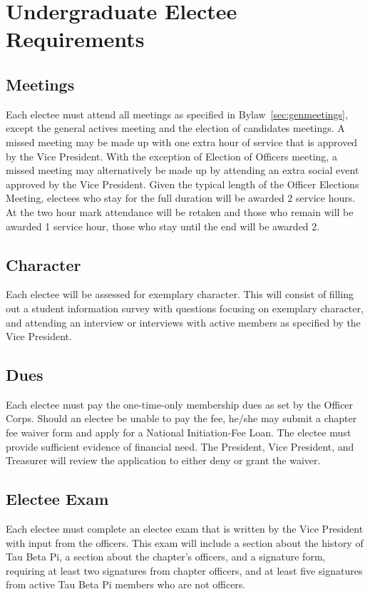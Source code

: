 \chapter{Undergraduate Electee Requirements}\label{sec:ugradreqs}
\section{Meetings} Each electee must attend all meetings as specified in Bylaw~\ref{sec:genmeetings}, except the general actives meeting and the election of candidates  meetings. A missed meeting may be made up with one extra hour of service that is approved by the Vice President. 
With the exception of Election of Officers meeting, a missed meeting may alternatively be made up by attending an extra social event approved by the Vice President. Given the typical length of the Officer Elections Meeting, electees who stay for the full duration will be awarded 2 service hours. At the two hour mark attendance will be retaken and those who remain will be awarded 1 service hour, those who stay until the end will be awarded 2.
\section{Character} Each electee will be assessed for exemplary character. This will consist of filling out a student information survey with questions focusing on exemplary character, and attending  an interview or interviews with active members as specified by the Vice President. %
\section{Dues} Each electee must pay the one-time-only membership dues as set by the Officer Corps. Should an electee be unable to pay the fee, he/she may submit a chapter fee waiver form and apply for a National Initiation-Fee Loan. The electee must provide sufficient evidence of financial need. The President, Vice President, and Treasurer will review the application to either deny or grant the waiver.
\section{Electee Exam} Each electee must complete an electee exam that is written by the Vice President with input from the officers. This exam will include a section about the history of Tau Beta Pi, a section about the chapter's officers, and a signature form, requiring at least two signatures from chapter officers, and at least five signatures from active Tau Beta Pi members who are not officers.
